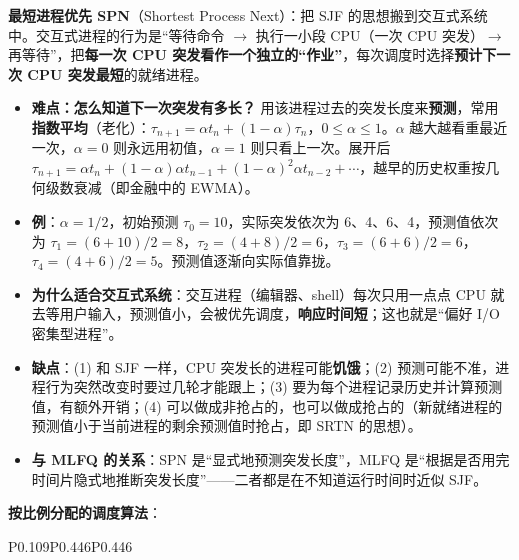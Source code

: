 \textbf{最短进程优先 SPN}（Shortest Process Next）：把 SJF 的思想搬到交互式系统中。交互式进程的行为是“等待命令 $\to$ 执行一小段 CPU（一次 CPU 突发）$\to$ 再等待”，把\textbf{每一次 CPU 突发看作一个独立的“作业”}，每次调度时选择\textbf{预计下一次 CPU 突发最短}的就绪进程。
\begin{itemize}
    \item \textbf{难点：怎么知道下一次突发有多长？} 用该进程过去的突发长度来\textbf{预测}，常用\textbf{指数平均}（老化）：$\tau_{n+1} = \alpha t_n + (1-\alpha)\tau_n$，$0 \le \alpha \le 1$。$\alpha$ 越大越看重最近一次，$\alpha = 0$ 则永远用初值，$\alpha = 1$ 则只看上一次。展开后 $\tau_{n+1} = \alpha t_n + (1-\alpha)\alpha t_{n-1} + (1-\alpha)^2 \alpha t_{n-2} + \cdots$，越早的历史权重按几何级数衰减（即金融中的 EWMA）。
    \item \textbf{例}：$\alpha = 1/2$，初始预测 $\tau_0 = 10$，实际突发依次为 6、4、6、4，预测值依次为 $\tau_1 = (6+10)/2 = 8$，$\tau_2 = (4+8)/2 = 6$，$\tau_3 = (6+6)/2 = 6$，$\tau_4 = (4+6)/2 = 5$。预测值逐渐向实际值靠拢。
    \item \textbf{为什么适合交互式系统}：交互进程（编辑器、shell）每次只用一点点 CPU 就去等用户输入，预测值小，会被优先调度，\textbf{响应时间短}；这也就是“偏好 I/O 密集型进程”。
    \item \textbf{缺点}：(1) 和 SJF 一样，CPU 突发长的进程可能\textbf{饥饿}；(2) 预测可能不准，进程行为突然改变时要过几轮才能跟上；(3) 要为每个进程记录历史并计算预测值，有额外开销；(4) 可以做成非抢占的，也可以做成抢占的（新就绪进程的预测值小于当前进程的剩余预测值时抢占，即 SRTN 的思想）。
    \item \textbf{与 MLFQ 的关系}：SPN 是“显式地预测突发长度”，MLFQ 是“根据是否用完时间片隐式地推断突发长度”——二者都是在不知道运行时间时近似 SJF。
\end{itemize}

\textbf{按比例分配的调度算法}：\par
\begin{btab}{P{0.109}P{0.446}P{0.446}}
\end{btab}

